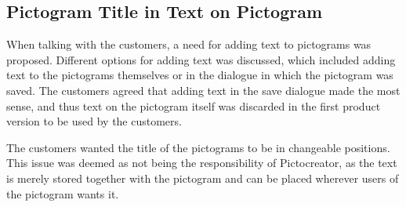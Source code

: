 \subsection{Pictogram Title in Text on Pictogram}
When talking with the customers, a need for adding text to pictograms was proposed. 
Different options for adding text was discussed, which included adding text to the pictograms themselves or in the dialogue in which the pictogram was saved.
The customers agreed that adding text in the save dialogue made the most sense, and thus text on the pictogram itself was discarded in the first product version to be used by the customers.

The customers wanted the title of the pictograms to be in changeable positions. 
This issue was deemed as not being the responsibility of Pictocreator, as the text is merely stored together with the pictogram and can be placed wherever users of the pictogram wants it.
